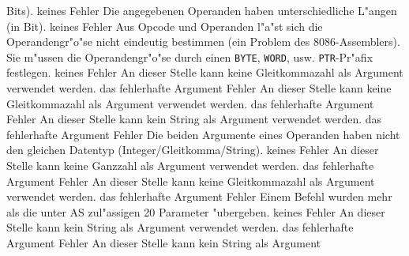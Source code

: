 \documentclass[12pt,a4paper,twoside]{report}
\newcommand{\tty}[1]{{\tt #1}}
\newcommand{\asname}{AS}
\begin{document}
\begin{description}
{                Bits).}
               {keines}
               {Fehler}
               {Die angegebenen Operanden haben unterschiedliche
                L"angen (in Bit).}
               {keines}
               {Fehler}
               {Aus Opcode und Operanden l"a"st sich die
                Operandengr"o"se nicht eindeutig bestimmen (ein Problem
                des 8086-Assemblers).  Sie m"ussen die Operandengr"o"se
                durch einen \tty{BYTE}, \tty{WORD}, usw. \tty{PTR}-Pr"afix
	        festlegen.}
               {keines}
               {Fehler}
               {An dieser Stelle kann keine Gleitkommazahl als Argument
                verwendet werden.}
               {das fehlerhafte Argument}
               {Fehler}
               {An dieser Stelle kann keine Gleitkommazahl als Argument
                verwendet werden.}
               {das fehlerhafte Argument}
               {Fehler}
               {An dieser Stelle kann kein String als Argument
                verwendet werden.}
               {das fehlerhafte Argument}
               {Fehler}
               {Die beiden Argumente eines Operanden haben nicht
                den gleichen Datentyp (Integer/Gleitkomma/String).}
               {keines}
               {Fehler}
               {An dieser Stelle kann keine Ganzzahl als Argument
                verwendet werden.}
               {das fehlerhafte Argument}
               {Fehler}
               {An dieser Stelle kann keine Gleitkommazahl als Argument
                verwendet werden.}
               {das fehlerhafte Argument}
               {Fehler}
               {Einem Befehl wurden mehr als die unter \asname{}
                zul"assigen 20 Parameter "ubergeben.}
               {keines}
               {Fehler}
               {An dieser Stelle kann kein String als Argument
                verwendet werden.}
               {das fehlerhafte Argument}
               {Fehler}
               {An dieser Stelle kann kein String als Argument
}
\end{description}
\end{document}
